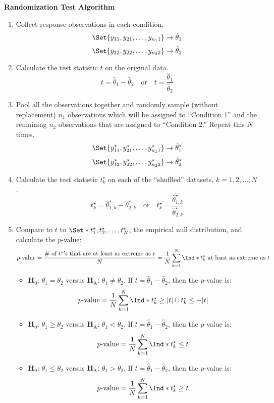\begin{framed}
      \textbf{Randomization Test Algorithm}
      \begin{enumerate}
            \item Collect response observations in each condition.
                  \[ \Set{y_{11},y_{21},\ldots,y_{n_1 1}}\to \hat{\theta}_1 \]
                  \[ \Set{y_{12},y_{22},\ldots,y_{n_2 2}}\to \hat{\theta}_2 \]
            \item Calculate the test statistic $ t $ on the original data.
                  \[ t=\hat{\theta}_1-\hat{\theta}_2\quad\text{or}\quad t=\frac{\hat{\theta}_1}{\hat{\theta}_2} \]
            \item Pool all the observations together and randomly sample (without replacement)
                  $ n_1 $ observations which will be assigned to ``Condition 1'' and the remaining $ n_2 $
                  observations that are assigned to ``Condition 2.'' Repeat this $ N $ times.
                  \[ \Set{y_{11}^\star,y_{21}^\star,\ldots,y_{n_1 1}^\star}\to \hat{\theta}_1^\star \]
                  \[ \Set{y_{12}^\star,y_{22}^\star,\ldots,y_{n_2 2}^\star}\to \hat{\theta}_2^\star \]
            \item Calculate the test statistic $ t_k^\star $ on each of the ``shuffled'' datasets, $ k=1,2,\ldots,N $.
                  \[ t_k^\star=\hat{\theta}_{1,k}^\star-\hat{\theta}_{2,k}^\star\quad\text{or}\quad t_k^\star=\frac{\hat{\theta}_{1,k}^\star}{\hat{\theta}_{2,k}^\star}  \]
            \item Compare to $ t $ to $ \Set*{t_1^\star,t_2^\star,\ldots,t_N^\star} $, the empirical
                  null distribution, and calculate the $ p $-value:
                  \[ p\text{-value}=\frac{\text{\# of $t^\star$'s that are at least as extreme as $t$}}{N}=\frac{1}{N} \sum_{k=1}^{N} \Ind*{t_k^\star\text{ at least as extreme as $t$}}  \]
                  \begin{itemize}
                        \item $ \mathbf{H}_0 $: $ \theta_1=\theta_2 $ versus $ \mathbf{H}_\text{A} $: $ \theta_1\ne \theta_2 $. If $ t=\hat{\theta}_1-\hat{\theta}_2 $, then
                              the $ p $-value is:
                              \[ p\text{-value}=\frac{1}{N} \sum_{k=1}^{N} \Ind*{t_k^\star\ge \abs{t}\cup t_k^\star\le -\abs{t}} \]
                        \item $ \mathbf{H}_0 $: $ \theta_1\ge \theta_2 $ versus $ \mathbf{H}_\text{A} $: $ \theta_1<\theta_2 $. If $ t=\hat{\theta}_1-\hat{\theta}_2 $, then
                              the $ p $-value is:
                              \[ p\text{-value}=\frac{1}{N} \sum_{k=1}^{N} \Ind*{t_k^\star\le t} \]
                        \item $ \mathbf{H}_0 $: $ \theta_1\le \theta_2 $ versus $ \mathbf{H}_\text{A} $: $ \theta_1>\theta_2 $. If $ t=\hat{\theta}_1-\hat{\theta}_2 $, then
                              the $ p $-value is:
                              \[ p\text{-value}=\frac{1}{N} \sum_{k=1}^{N} \Ind*{t_k^\star\ge t} \]
                  \end{itemize}
      \end{enumerate}
\end{framed}
